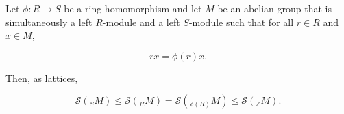 Let $\phi: R \rightarrow S$ be a ring homomorphism and let $M$ be an abelian group that is simultaneously a left $R$-module and a left $S$-module such that for all $r \in R$ and $x \in M$,

$$r x = \phi(r) x.$$

Then, as lattices,

$$\mathcal{S}(_S M) \leq \mathcal{S}(_R M) = \mathcal{S}(_{\phi(R)} M) \leq \mathcal{S}(_{\mathbb{Z}} M).$$
